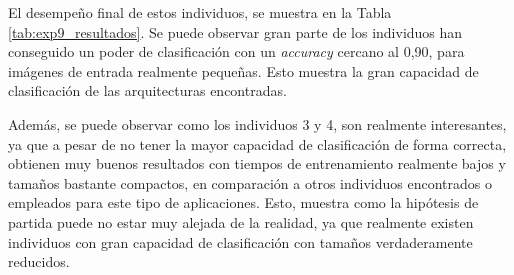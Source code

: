 El desempeño final de estos individuos, se muestra en la Tabla \ref{tab:exp9_resultados}. Se puede observar gran parte de los individuos han conseguido un poder de clasificación con un \textit{accuracy} cercano al 0,90, para imágenes de entrada realmente pequeñas. Esto muestra la gran capacidad de clasificación de las arquitecturas encontradas.

Además, se puede observar como los individuos 3 y 4, son realmente interesantes, ya que a pesar de no tener la mayor capacidad de clasificación de forma correcta, obtienen muy buenos resultados con tiempos de entrenamiento realmente bajos y tamaños bastante compactos, en comparación a otros individuos encontrados o empleados para este tipo de aplicaciones. Esto, muestra como la hipótesis de partida puede no estar muy alejada de la realidad, ya que realmente existen individuos con gran capacidad de clasificación con tamaños verdaderamente reducidos.

